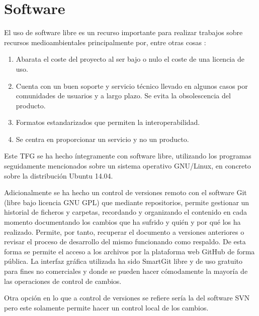 
\section{Software} \label{sec:software}
El uso de software libre es un recurso importante para realizar trabajos sobre recursos medioambientales principalmente por, entre otras cosas \citep{MatellanOliveira2004}:

\begin{enumerate}
	\item Abarata el coste del proyecto al ser bajo o nulo el coste de una licencia de uso.
	\item Cuenta con un buen soporte y servicio técnico llevado en algunos casos por comunidades de usuarios y a largo plazo. Se evita la obsolescencia del producto.
	\item Formatos estandarizados que permiten la interoperabilidad.
	\item Se centra en proporcionar un servicio y no un producto.
\end{enumerate}

Este \ac{TFG} se ha hecho íntegramente con software libre, utilizando los programas seguidamente mencionados sobre un sistema operativo GNU/Linux, en concreto sobre la distribución Ubuntu 14.04.\Sep

Adicionalmente se ha hecho un control de versiones remoto con el software Git (libre bajo licencia GNU GPL) que mediante repositorios, permite gestionar un historial de ficheros y carpetas, recordando y organizando el contenido en cada momento documentando los cambios que ha sufrido y quién y por qué los ha realizado. Permite, por tanto, recuperar el documento a versiones anteriores o revisar el proceso de desarrollo del mismo funcionando como respaldo. De esta forma se permite el acceso a los archivos por la plataforma web GitHub de forma pública. La interfaz gráfica utilizada ha sido SmartGit \citep{GmbH2015} libre y de uso gratuito para fines no comerciales y donde se pueden hacer cómodamente la mayoría de las operaciones de control de cambios.\Sep

Otra opción en lo que a control de versiones se refiere sería la del software \ac{SVN} \citep{Latex2011} pero este solamente permite hacer un control local de los cambios.

